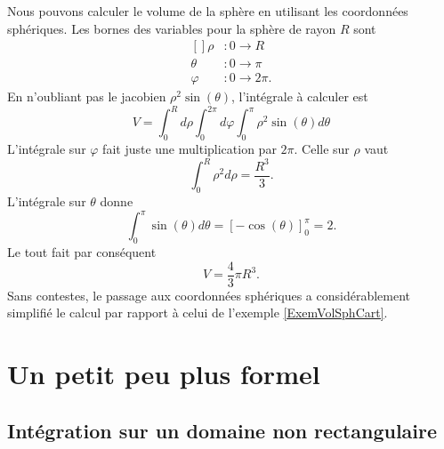 \begin{example}
    Nous pouvons calculer le volume de la sphère en utilisant les coordonnées sphériques. Les bornes des variables pour la sphère de rayon $R$ sont
    \begin{equation}
        \begin{aligned}[]
            \rho&\colon 0\to R\\
            \theta&\colon 0\to \pi\\
            \varphi&\colon 0\to 2\pi.
        \end{aligned}
    \end{equation}
    En n'oubliant pas le jacobien $\rho^2\sin(\theta)$, l'intégrale à calculer est
    \begin{equation}
        V=\int_0^Rd\rho\int_0^{2\pi}d\varphi\int_0^{\pi}\rho^2\sin(\theta)d\theta
    \end{equation}
    L'intégrale sur $\varphi$ fait juste une multiplication par $2\pi$. Celle sur $\rho$ vaut
    \begin{equation}
        \int_0^R\rho^2d\rho=\frac{ R^3 }{ 3 }.
    \end{equation}
    L'intégrale sur $\theta$ donne
    \begin{equation}
        \int_0^{\pi}\sin(\theta)d\theta=[-\cos(\theta)]_{0}^{\pi}=2.
    \end{equation}
    Le tout fait par conséquent
    \begin{equation}
        V=\frac{ 4 }{ 3 }\pi R^3.
    \end{equation}
    Sans contestes, le passage aux coordonnées sphériques a considérablement simplifié le calcul par rapport à celui de l'exemple \ref{ExemVolSphCart}.
\end{example}


\section{Un petit peu plus formel}

\subsection{Intégration sur un domaine non rectangulaire}

